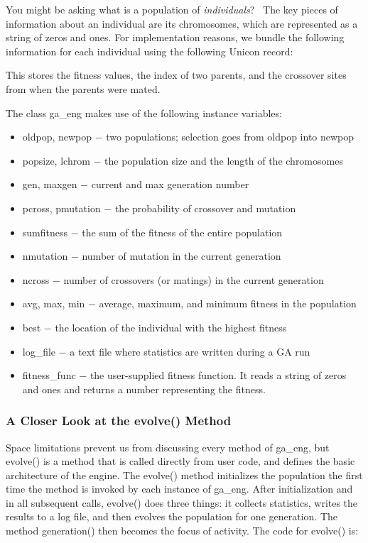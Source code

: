 You might be asking what is a population of \textit{individuals}? \ The
key pieces of information about an individual are its chromosomes,
which are represented as a string of zeros and ones. For implementation
reasons, we bundle the following information for each individual using
the following Unicon record: 


This stores the fitness values, the index of two parents, and the
crossover sites from when the parents were mated.

The class \textsf{ga\_eng} makes use of the following
instance variables: 

\begin{itemize}
\item \textsf{oldpop}, \textsf{newpop} $-$ two populations; selection
goes from \textsf{oldpop} into \textsf{newpop}
\item \textsf{popsize}, \textsf{lchrom} $-$ the population size and the
length of the chromosomes
\item \textsf{gen}, \textsf{maxgen} $-$ current and max generation
number
\item \textsf{pcross}, \textsf{pmutation} $-$ the probability of
crossover and mutation
\item \textsf{sumfitness} $-$ the sum of the fitness of the entire
population
\item \textsf{nmutation} $-$ number of mutation in the current
generation
\item \textsf{ncross} $-$ number of crossovers (or matings) in the
current generation
\item \textsf{avg}, \textsf{max}, \textsf{min} $-$ average, maximum, and
minimum fitness in the population
\item \textsf{best} $-$ the location of the individual with the highest
fitness
\item \textsf{log\_file} $-$ a text file where statistics are written
during a GA run
\item \textsf{fitness\_func} $-$ the user-supplied fitness function. It
reads a string of zeros and ones and returns a number representing the
fitness.
\end{itemize}
\subsubsection[A Closer Look at the evolve() Method]{A Closer Look at
the evolve() Method}
Space limitations prevent us from discussing every method of
\textsf{ga\_eng}, but \textsf{evolve()} is a method that is called
directly from user code, and defines the basic architecture of the
engine. The \textsf{evolve()} method initializes the population the
first time the method is invoked by each instance of \textsf{ga\_eng}.
After initialization and in all subsequent calls, \textsf{evolve()}
does three things: it collects statistics, writes the results to a log
file, and then evolves the population for one generation. The method
\textsf{generation()} then becomes the focus of activity. The code for
\textsf{evolve()} is:

